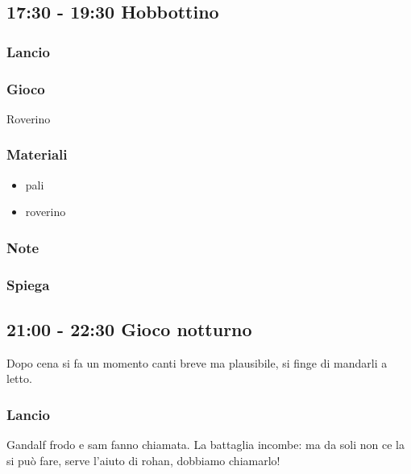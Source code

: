 \documentclass[../main.tex]{subfiles}
\begin{document}
    \subsection{17:30 - 19:30 Hobbottino}
        \subsubsection{Lancio}
        \subsubsection{Gioco}
        Roverino
        \subsubsection{Materiali}
        \begin{itemize}
            \item pali
            \item roverino
        \end{itemize}
        \subsubsection{Note}
        \subsubsection{Spiega}
        
    \subsection{21:00 - 22:30 Gioco notturno}
    Dopo cena si fa un momento canti breve ma plausibile, si finge di mandarli a letto.
        \subsubsection{Lancio}
        Gandalf frodo e sam fanno chiamata. La battaglia incombe: ma da soli non ce la si può fare, serve l’aiuto di rohan, dobbiamo chiamarlo!
\end{document}
